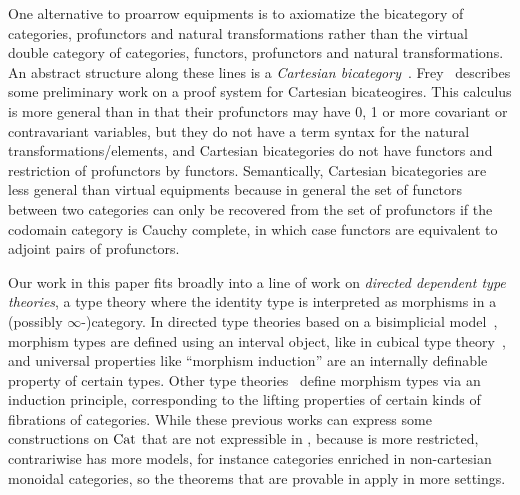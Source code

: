 \documentclass{llncs}
\begin{document}
One alternative to proarrow equipments is to axiomatize the bicategory
of categories, profunctors and natural transformations rather than the
virtual double category of categories, functors, profunctors and natural
transformations. An abstract structure along these lines is a
\emph{Cartesian
  bicategory}~\citet{CARBONI198711}.
Frey~\citet{frey} describes some preliminary work on
a proof system for Cartesian bicateogires.  This calculus is more
general than \vett{} in that their profunctors may have 0, 1 or more
covariant or contravariant variables, but they do not have a term syntax
for the natural transformations/elements, and Cartesian bicategories do
not have functors and restriction of profunctors by
functors. Semantically, Cartesian bicategories are less general
than virtual equipments because in general the set of functors between
two categories can only be recovered from the set of profunctors if the
codomain category is Cauchy complete, in which case functors are
equivalent to adjoint pairs of profunctors.

Our work in this paper fits broadly into a line of work on
\emph{directed dependent type theories}, a type theory where the
identity type is interpreted as morphisms in a (possibly
$\infty$-)category.  In directed type theories based on a bisimplicial
model~\cite{riehlshulman17directed,buchholtzweinberger21fibered,weinberger22thesis,WeaverLicata20},
morphism types are defined using an interval object, like in cubical
type
theory~\cite{bch18,cchm18cubical,angiuli+18cartesian-csl,abcfhl17cartesian},
and universal properties like ``morphism induction'' are an internally
definable property of certain types.  Other type
theories~\cite{north18,ahrens+22semantics-2dtt} define morphism types via an induction
principle, corresponding to the lifting properties of certain kinds of
fibrations of categories.  While these previous works can express some
constructions on $\textrm{Cat}$ that are not expressible in \vett{}, because
\vett{} is more restricted, \vett{} contrariwise has more models, for
instance categories enriched in non-cartesian monoidal categories, so
the theorems that are provable in \vett{} apply in more settings.

\end{document}

